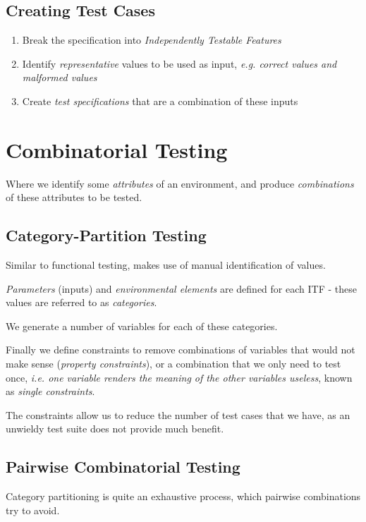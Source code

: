 \documentclass{article}
\begin{document}
\subsection{Creating Test Cases}

\begin{enumerate}
\item
  Break the specification into \textit{Independently Testable Features}
\item 
  Identify \textit{representative} values to be used as input, \textit{e.g. correct values and malformed values}
\item
  Create \textit{test specifications} that are a combination of these inputs
\end{enumerate}

\section{Combinatorial Testing}

Where we identify some \textit{attributes} of an environment, and produce \textit{combinations} of these attributes to be tested.

\subsection{Category-Partition Testing}

Similar to functional testing, makes use of manual identification of values.

\textit{Parameters} (inputs) and \textit{environmental elements} are defined for each ITF - these values are referred to as \textit{categories}.

We generate a number of variables for each of these categories.

Finally we define constraints to remove combinations of variables that would not make sense (\textit{property constraints}), or a combination that we only need to test once, \textit{i.e. one variable renders the meaning of the other variables useless}, known as \textit{single constraints}.

The constraints allow us to reduce the number of test cases that we have, as an unwieldy test suite does not provide much benefit.

\subsection{Pairwise Combinatorial Testing}

Category partitioning is quite an exhaustive process, which pairwise combinations try to avoid.
\end{document}
